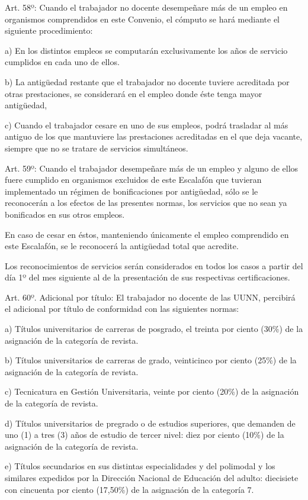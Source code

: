 \documentclass[]{article}
\begin{document}
Art. 58º: Cuando el trabajador no docente desempeñare más de un empleo
en organismos comprendidos en este Convenio, el cómputo se hará mediante
el siguiente procedimiento:

a) En los distintos empleos se computarán exclusivamente los años de
servicio cumplidos en cada uno de ellos.

b) La antigüedad restante que el trabajador no docente tuviere
acreditada por otras prestaciones, se considerará en el empleo donde
éste tenga mayor antigüedad,

c) Cuando el trabajador cesare en uno de sus empleos, podrá trasladar al
más antiguo de los que mantuviere las prestaciones acreditadas en el que
deja vacante, siempre que no se tratare de servicios simultáneos.

Art. 59º: Cuando el trabajador desempeñare más de un empleo y alguno de
ellos fuere cumplido en organismos excluidos de este Escalafón que
tuvieran implementado un régimen de bonificaciones por antigüedad, sólo
se le reconocerán a los efectos de las presentes normas, los servicios
que no sean ya bonificados en sus otros empleos.

En caso de cesar en éstos, manteniendo únicamente el empleo comprendido
en este Escalafón, se le reconocerá la antigüedad total que acredite.

Los reconocimientos de servicios serán considerados en todos los casos a
partir del día 1º del mes siguiente al de la presentación de sus
respectivas certificaciones.

Art. 60º. Adicional por título: El trabajador no docente de las UUNN,
percibirá el adicional por título de conformidad con las siguientes
normas:

a) Títulos universitarios de carreras de posgrado, el treinta por ciento
(30\%) de la asignación de la categoría de revista.

b) Títulos universitarios de carreras de grado, veinticinco por ciento
(25\%) de la asignación de la categoría de revista.

c) Tecnicatura en Gestión Universitaria, veinte por ciento (20\%) de la
asignación de la categoría de revista.

d) Títulos universitarios de pregrado o de estudios superiores, que
demanden de uno (1) a tres (3) años de estudio de tercer nivel: diez por
ciento (10\%) de la asignación de la categoría de revista.

e) Títulos secundarios en sus distintas especialidades y del polimodal y
los similares expedidos por la Dirección Nacional de Educación del
adulto: diecisiete con cincuenta por ciento (17,50\%) de la asignación
de la categoría 7.
\end{document}

